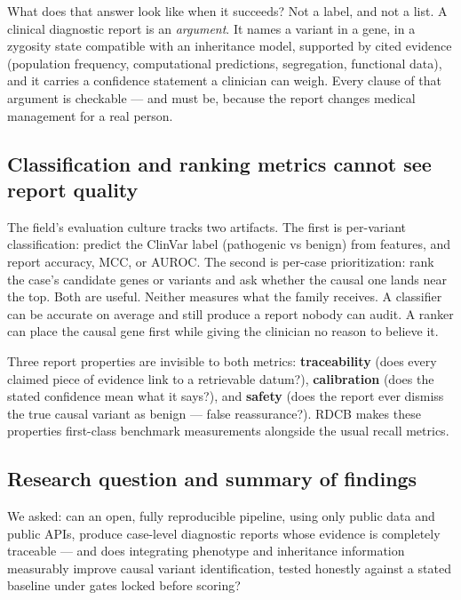 \documentclass[11pt]{article}
\begin{document}
What does that answer look like when it succeeds? Not a label, and not a list. A
clinical diagnostic report is an \emph{argument}. It names a variant in a gene, in a
zygosity state compatible with an inheritance model, supported by cited evidence
(population frequency, computational predictions, segregation, functional data), and
it carries a confidence statement a clinician can weigh. Every clause of that
argument is checkable --- and must be, because the report changes medical management
for a real person.

\subsection{Classification and ranking metrics cannot see report quality}
The field's evaluation culture tracks two artifacts. The first is per-variant
classification: predict the ClinVar label (pathogenic vs benign) from features, and
report accuracy, MCC, or AUROC. The second is per-case prioritization: rank the
case's candidate genes or variants and ask whether the causal one lands near the top.
Both are useful. Neither measures what the family receives. A classifier can be
accurate on average and still produce a report nobody can audit. A ranker can place
the causal gene first while giving the clinician no reason to believe it.

Three report properties are invisible to both metrics: \textbf{traceability} (does
every claimed piece of evidence link to a retrievable datum?), \textbf{calibration}
(does the stated confidence mean what it says?), and \textbf{safety} (does the report
ever dismiss the true causal variant as benign --- false reassurance?). RDCB makes
these properties first-class benchmark measurements alongside the usual recall
metrics.

\subsection{Research question and summary of findings}
We asked: can an open, fully reproducible pipeline, using only public data and public
APIs, produce case-level diagnostic reports whose evidence is completely traceable ---
and does integrating phenotype and inheritance information measurably improve causal
variant identification, tested honestly against a stated baseline under gates locked
before scoring?
\end{document}
